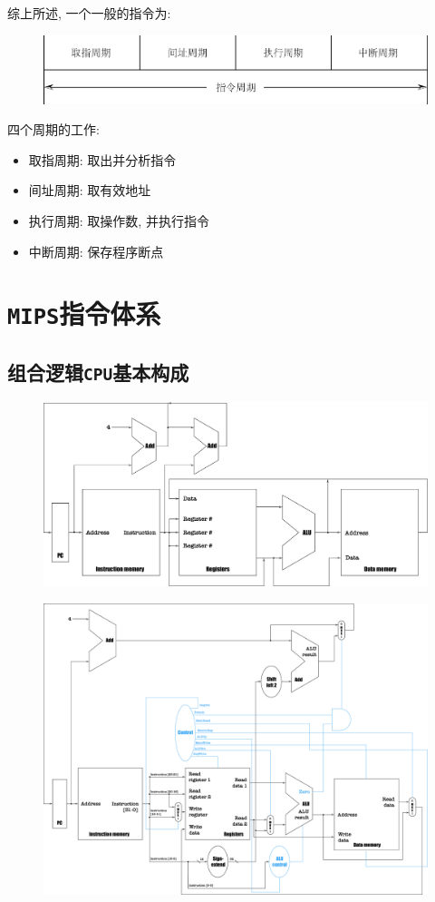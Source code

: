 综上所述, 一个一般的指令为:
\begin{figure}[H]
\centering
\includegraphics[scale=.6]{img/figure23.pdf}
\end{figure}
四个周期的工作:
\begin{itemize}
\item 取指周期: 取出并分析指令
\item 间址周期: 取有效地址
\item 执行周期: 取操作数, 并执行指令
\item 中断周期: 保存程序断点
\end{itemize}
\section{\texttt{MIPS}指令体系}
\subsection{组合逻辑\texttt{CPU}基本构成}
\begin{figure}[H]
\centering
\includegraphics[scale=.3]{img/figure24.pdf}
\end{figure}
\begin{figure}[H]
\centering
\includegraphics[scale=.25]{img/figure25.pdf}
\end{figure}

















